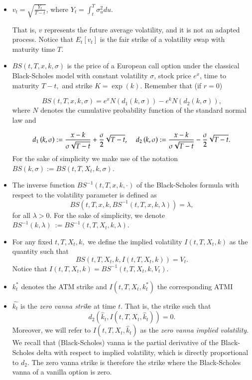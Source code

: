 \documentclass[11pt]{article}
\begin{document}
\begin{itemize}
\item $v_t=\sqrt{\frac{Y_t}{T-t}}$, where $Y_t=\int_{t}^{T}\sigma _{u}^{2}du$.

That is, $v$
represents the future average volatility, and it is not an adapted process. 
Notice that $E_{t}\left[
v_{t}\right] $ is the fair strike of a volatility swap with maturity time $T.$

\item $BS(t,T,x,k,\sigma )$ is the price of a  European call option
under the classical Black-Scholes model with constant volatility $\sigma $,
stock price $e^x$, time to maturity $T-t,$ and strike $K=\exp
(k) $. Remember that (if $r=0$)

\[
BS(t,T,x,k,\sigma )=e^{x}N(d_1(k,\sigma ))-e^{k}N(d_2(k,\sigma )), 
\]%
where $N$ denotes the cumulative probability function of the standard normal
law and

\[
d_1\left( k,\sigma \right) :=\frac{x-k}{\sigma \sqrt{T-t}}+
\frac{\sigma }{2}\sqrt{T-t},  \hspace{0.4cm} d_2\left( k,\sigma \right) :=\frac{x-k}{\sigma \sqrt{T-t}}-
\frac{\sigma }{2}\sqrt{T-t}.
\]%
For the sake of simplicity we make use of the notation $BS(k,\sigma):=BS(t,T,X_t,k,\sigma )$.
\item  The inverse function $BS^{-1}(t,T,x,k, \cdot)$ of the Black-Scholes formula with respect to the volatility parameter is defined as
\[
BS(t,T,x,k, BS^{-1}( t,T,x,k,\lambda) )=\lambda,
\]
for all $\lambda>0$.
For the sake of simplicity, we denote $BS^{-1}(k,\lambda)\ :=BS^{-1}(t,T,X_{t},k,\lambda)$.

\item For any fixed $t,T,X_{t},k,$ we define the implied volatility $I(t,T,X_{t},k) $ as the quantity such that 
\[
BS( t,T,X_{t},k,I( t,T,X_{t},k) ) =V_{t}.
\]
Notice that $I(t,T,X_t,k)=BS^{-1}( t,T,X_t,k,V_t)$.

\item $k_t^*$ denotes the ATM strike and $I(t,T,X_t,k_t^*)$ the corresponding ATMI

\item $\hat{k_t}$ is the {\it zero vanna strik}e at time $t$. That is, the strike such that 
$$d_2(\hat{k}_t,I(t,T,X_t,\hat{k}_t))=0.$$ Moreover, we will refer to $I(t,T,X_t,\hat{k}_t)$ as the {\it zero vanna implied volatility}. We recall that (Black-Scholes) vanna is the partial derivative of the Black-Scholes delta with respect to implied volatility, which is directly proportional to $d_2$. The zero vanna strike is therefore the strike where the Black-Scholes vanna of a vanilla option is zero.


\end{itemize}
\end{document}

